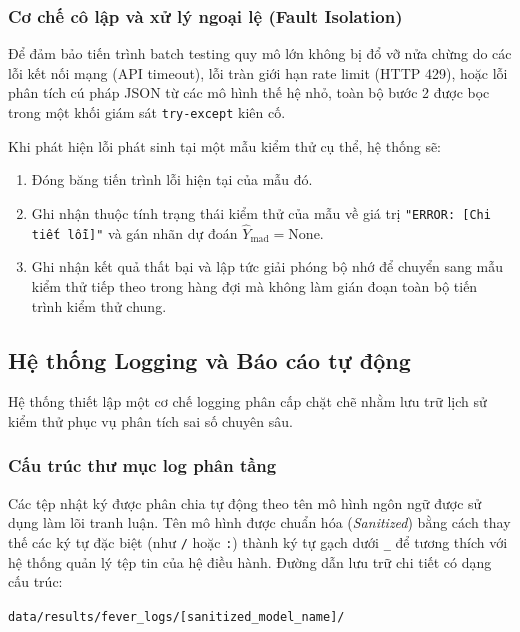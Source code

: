 \documentclass[12pt,a4paper]{report}
\begin{document}
\subsubsection{Cơ chế cô lập và xử lý ngoại lệ (Fault Isolation)}
Để đảm bảo tiến trình batch testing quy mô lớn không bị đổ vỡ nửa chừng do các lỗi kết nối mạng (API timeout), lỗi tràn giới hạn rate limit (HTTP 429), hoặc lỗi phân tích cú pháp JSON từ các mô hình thế hệ nhỏ, toàn bộ bước 2 được bọc trong một khối giám sát \texttt{try-except} kiên cố. 

Khi phát hiện lỗi phát sinh tại một mẫu kiểm thử cụ thể, hệ thống sẽ:
\begin{enumerate}
    \item Đóng băng tiến trình lỗi hiện tại của mẫu đó.
    \item Ghi nhận thuộc tính trạng thái kiểm thử của mẫu về giá trị \texttt{"ERROR: [Chi tiết lỗi]"} và gán nhãn dự đoán $\hat{Y}_{\text{mad}} = \text{None}$.
    \item Ghi nhận kết quả thất bại và lập tức giải phóng bộ nhớ để chuyển sang mẫu kiểm thử tiếp theo trong hàng đợi mà không làm gián đoạn toàn bộ tiến trình kiểm thử chung.
\end{enumerate}

\subsection{Hệ thống Logging và Báo cáo tự động}
Hệ thống thiết lập một cơ chế logging phân cấp chặt chẽ nhằm lưu trữ lịch sử kiểm thử phục vụ phân tích sai số chuyên sâu.

\subsubsection{Cấu trúc thư mục log phân tầng}
Các tệp nhật ký được phân chia tự động theo tên mô hình ngôn ngữ được sử dụng làm lõi tranh luận. Tên mô hình được chuẩn hóa (\textit{Sanitized}) bằng cách thay thế các ký tự đặc biệt (như \texttt{/} hoặc \texttt{:}) thành ký tự gạch dưới \texttt{\_} để tương thích với hệ thống quản lý tệp tin của hệ điều hành. Đường dẫn lưu trữ chi tiết có dạng cấu trúc:
\begin{center}
    \texttt{data/results/fever\_logs/[sanitized\_model\_name]/}
\end{center}
\end{document}
